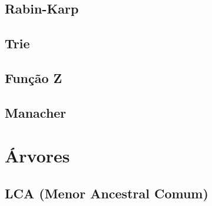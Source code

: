 \subsection{Rabin-Karp}


\subsection{Trie}


\subsection{Função Z}


% 

\subsection{Manacher}


% 

% 


\section{Árvores}

\subsection{LCA (Menor Ancestral Comum)}


% 

